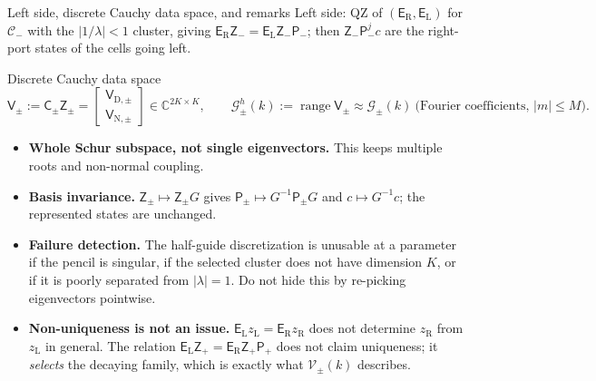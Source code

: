 \documentclass[aspectratio=169]{beamer}
\newcommand{\CC}{\mathbb{C}}
\begin{document}
\begin{frame}{Left side, discrete Cauchy data space, and remarks}
  \footnotesize
  Left side: QZ of $(\mathsf E_{\mathrm R},\mathsf E_{\mathrm L})$ for $\mathcal C_-$ with the
  $|1/\lambda|<1$ cluster, giving
  $\mathsf E_{\mathrm R}\mathsf Z_-=\mathsf E_{\mathrm L}\mathsf Z_-\mathsf P_-$; then
  $\mathsf Z_-\mathsf P_-^jc$ are the right-port states of the cells going left.
  \begin{block}{Discrete Cauchy data space}
    \[
      \mathsf V_\pm:=\mathsf C_\pm\mathsf Z_\pm=\begin{bmatrix}\mathsf V_{\mathrm D,\pm}\\ \mathsf V_{\mathrm N,\pm}\end{bmatrix}\in\CC^{2K\times K},
      \qquad\mathcal G^h_\pm(k):=\operatorname{range}\mathsf V_\pm\approx\mathcal G_\pm(k)\
      \text{(Fourier coefficients, $|m|\le M$)}.
    \]
  \end{block}
  \begin{itemize}
    \item \textbf{Whole Schur subspace, not single eigenvectors.} This keeps multiple
      roots and non-normal coupling.
    \item \textbf{Basis invariance.} $\mathsf Z_\pm\mapsto\mathsf Z_\pm G$ gives
      $\mathsf P_\pm\mapsto G^{-1}\mathsf P_\pm G$ and $c\mapsto G^{-1}c$; the represented
      states are unchanged.
    \item \textbf{Failure detection.} The half-guide discretization is unusable at a
      parameter if the pencil is singular, if the selected cluster does not have
      dimension $K$, or if it is poorly separated from $|\lambda|=1$. Do not hide this
      by re-picking eigenvectors pointwise.
    \item \textbf{Non-uniqueness is not an issue.}
      $\mathsf E_{\mathrm L}z_{\mathrm L}=\mathsf E_{\mathrm R}z_{\mathrm R}$ does not
      determine $z_{\mathrm R}$ from $z_{\mathrm L}$ in general. The relation
      $\mathsf E_{\mathrm L}\mathsf Z_+=\mathsf E_{\mathrm R}\mathsf Z_+\mathsf P_+$ does
      not claim uniqueness; it \emph{selects} the decaying family, which is exactly
      what $\mathcal V_\pm(k)$ describes.
  \end{itemize}
\end{frame}
\end{document}
